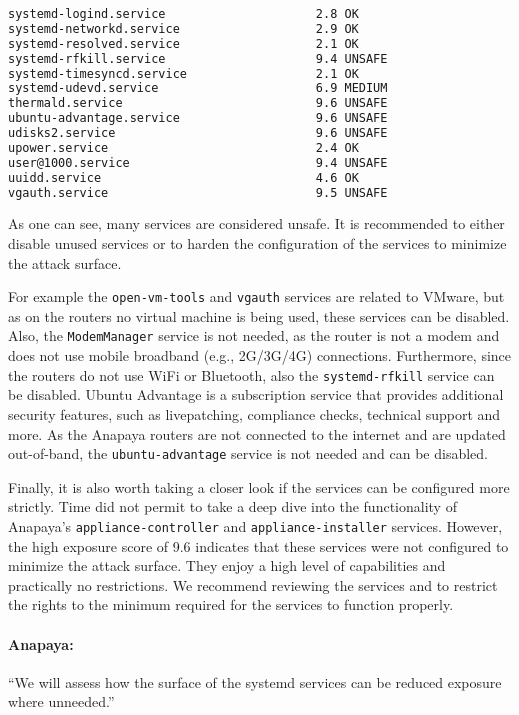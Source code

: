 \begin{lstlisting}[language=bash, deletekeywords={local}, numbers=none, caption={Output of \texttt{systemd-analyze security} on the device in Thun running Anapaya's system version v2.8.0.}]
systemd-logind.service                     2.8 OK        
systemd-networkd.service                   2.9 OK        
systemd-resolved.service                   2.1 OK        
systemd-rfkill.service                     9.4 UNSAFE    
systemd-timesyncd.service                  2.1 OK        
systemd-udevd.service                      6.9 MEDIUM    
thermald.service                           9.6 UNSAFE    
ubuntu-advantage.service                   9.6 UNSAFE    
udisks2.service                            9.6 UNSAFE    
upower.service                             2.4 OK        
user@1000.service                          9.4 UNSAFE    
uuidd.service                              4.6 OK        
vgauth.service                             9.5 UNSAFE    
\end{lstlisting}

As one can see, many services are considered unsafe.
It is recommended to either disable unused services or to harden the configuration of the services to minimize the attack surface.

For example the \texttt{open-vm-tools} and \texttt{vgauth} services are related to VMware, but as on the routers no virtual machine is being used, these services can be disabled.
Also, the \texttt{ModemManager} service is not needed, as the router is not a modem and does not use mobile broadband (e.g., 2G/3G/4G) connections.
Furthermore, since the routers do not use WiFi or Bluetooth, also the \texttt{systemd-rfkill} service can be disabled.
Ubuntu Advantage is a subscription service that provides additional security features, such as livepatching, compliance checks, technical support and more.
As the Anapaya routers are not connected to the internet and are updated out-of-band, the \texttt{ubuntu-advantage} service is not needed and can be disabled.

Finally, it is also worth taking a closer look if the services can be configured more strictly.
Time did not permit to take a deep dive into the functionality of Anapaya's \texttt{appliance-controller} and \texttt{appliance-installer} services.
However, the high exposure score of 9.6 indicates that these services were not configured to minimize the attack surface.
They enjoy a high level of capabilities and practically no restrictions.
We recommend reviewing the services and to restrict the rights to the minimum required for the services to function properly.

\begin{boxH}
\paragraph{Anapaya:}
``We will assess how the surface of the systemd services can be reduced exposure where unneeded.''
\end{boxH}

